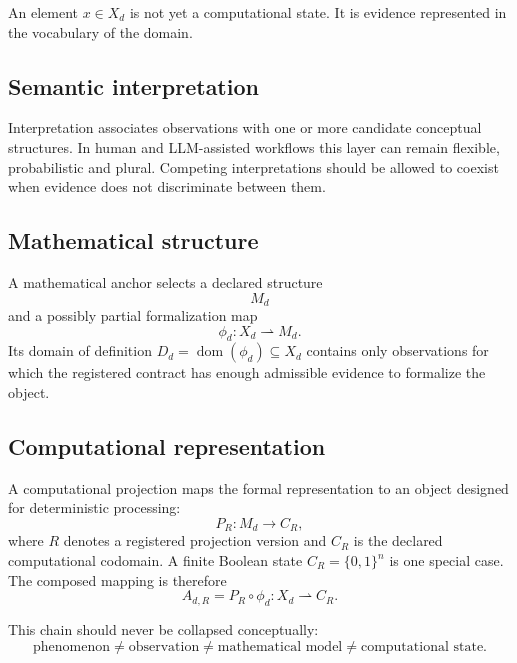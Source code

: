 \documentclass[11pt,a4paper]{article}
\newcommand{\B}{\{0,1\}}
\begin{document}
An element $x\in X_d$ is not yet a computational state. It is evidence represented in the vocabulary of the domain.

\subsection{Semantic interpretation}
Interpretation associates observations with one or more candidate conceptual structures. In human and LLM-assisted workflows this layer can remain flexible, probabilistic and plural. Competing interpretations should be allowed to coexist when evidence does not discriminate between them.

\subsection{Mathematical structure}
A mathematical anchor selects a declared structure
\begin{equation}
M_d
\end{equation}
and a possibly partial formalization map
\begin{equation}
\phi_d:X_d\rightharpoonup M_d.
\end{equation}
Its domain of definition $D_d=\operatorname{dom}(\phi_d)\subseteq X_d$ contains only observations for which the registered contract has enough admissible evidence to formalize the object.

\subsection{Computational representation}
A computational projection maps the formal representation to an object designed for deterministic processing:
\begin{equation}
P_R:M_d\rightarrow C_R,
\end{equation}
where $R$ denotes a registered projection version and $C_R$ is the declared computational codomain. A finite Boolean state $C_R=\B^n$ is one special case. The composed mapping is therefore
\begin{equation}
A_{d,R}=P_R\circ\phi_d:X_d\rightharpoonup C_R.
\end{equation}

This chain should never be collapsed conceptually:
\begin{equation}
\text{phenomenon}\neq\text{observation}\neq\text{mathematical model}\neq\text{computational state}.
\end{equation}
\end{document}
